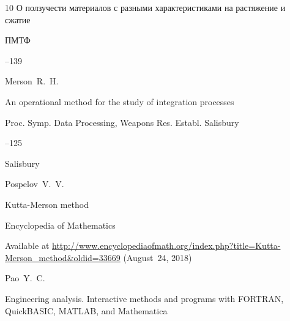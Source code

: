 \begin{thebibliography}{10}
\paper О ползучести материалов с разными характеристиками на растяжение и сжатие 

\jour ПМТФ



--139




















\by Merson~R.~H.

\paper An operational method for the study of integration processes

\inbook Proc. Symp. Data Processing, Weapons Res. Establ. Salisbury


–125

\publaddr Salisbury

\moreref

\by \linebreak Pospelov~V.~V.

\preprint  Kutta-Merson method

\preprintinfo Encyclopedia of Mathematics


\elink Available at \url{http://www.encyclopediaofmath.org/index.php?title=Kutta-Merson_method&oldid=33669} (August~24, 2018)








\by Pao~Y.~C.

\book Engineering analysis. Interactive methods and programs with FORTRAN, QuickBASIC, MATLAB, and Mathematica


\end{thebibliography}
